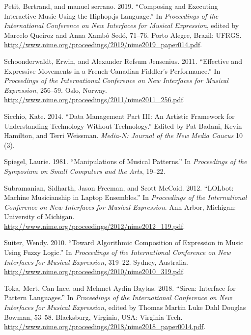 \documentclass{nime-alternate} %
\newlength{\cslhangindent}
\newenvironment{cslreferences}%
  {\setlength{\parindent}{0pt}%
  \everypar{\setlength{\hangindent}{\cslhangindent}}\ignorespaces}%
  {\par}
\begin{document}
\begin{cslreferences}
\leavevmode\hypertarget{ref-Petit2019}{}%
Petit, Bertrand, and manuel serrano. 2019. ``Composing and Executing
Interactive Music Using the Hiphop.js Language.'' In \emph{Proceedings
of the International Conference on New Interfaces for Musical
Expression}, edited by Marcelo Queiroz and Anna Xambó Sedó, 71--76.
Porto Alegre, Brazil: UFRGS.
\url{http://www.nime.org/proceedings/2019/nime2019_paper014.pdf}.

\leavevmode\hypertarget{ref-Schoonderwaldt2011}{}%
Schoonderwaldt, Erwin, and Alexander Refsum Jensenius. 2011. ``Effective
and Expressive Movements in a French-Canadian Fiddler's Performance.''
In \emph{Proceedings of the International Conference on New Interfaces
for Musical Expression}, 256--59. Oslo, Norway.
\url{http://www.nime.org/proceedings/2011/nime2011_256.pdf}.

\leavevmode\hypertarget{ref-Sicchio14}{}%
Sicchio, Kate. 2014. ``Data Management Part III: An Artistic Framework
for Understanding Technology Without Technology.'' Edited by Pat Badani,
Kevin Hamilton, and Terri Weissman. \emph{Media-N: Journal of the New
Media Caucus} 10 (3).

\leavevmode\hypertarget{ref-Spiegel81}{}%
Spiegel, Laurie. 1981. ``Manipulations of Musical Patterns.'' In
\emph{Proceedings of the Symposium on Small Computers and the Arts},
19--22.

\leavevmode\hypertarget{ref-Subramanian2012}{}%
Subramanian, Sidharth, Jason Freeman, and Scott McCoid. 2012. ``LOLbot:
Machine Musicianship in Laptop Ensembles.'' In \emph{Proceedings of the
International Conference on New Interfaces for Musical Expression}. Ann
Arbor, Michigan: University of Michigan.
\url{http://www.nime.org/proceedings/2012/nime2012_119.pdf}.

\leavevmode\hypertarget{ref-Suiter2010}{}%
Suiter, Wendy. 2010. ``Toward Algorithmic Composition of Expression in
Music Using Fuzzy Logic.'' In \emph{Proceedings of the International
Conference on New Interfaces for Musical Expression}, 319--22. Sydney,
Australia. \url{http://www.nime.org/proceedings/2010/nime2010_319.pdf}.

\leavevmode\hypertarget{ref-Toka2018}{}%
Toka, Mert, Can Ince, and Mehmet Aydin Baytas. 2018. ``Siren: Interface
for Pattern Languages.'' In \emph{Proceedings of the International
Conference on New Interfaces for Musical Expression}, edited by Thomas
Martin Luke Dahl Douglas Bowman, 53--58. Blacksburg, Virginia, USA:
Virginia Tech.
\url{http://www.nime.org/proceedings/2018/nime2018_paper0014.pdf}.


\end{cslreferences}
\end{document}
